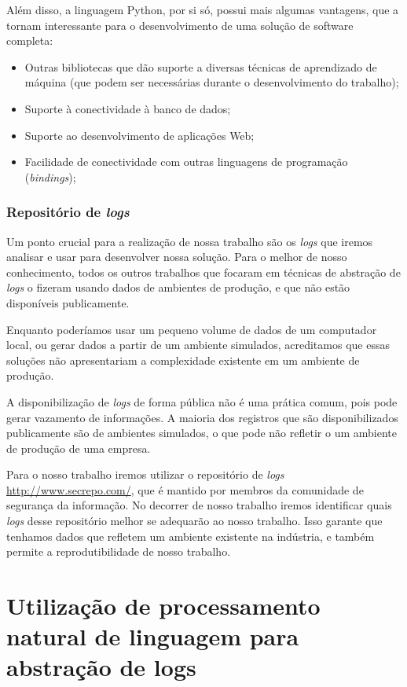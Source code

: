\documentclass[
	12pt,				%
	openright,			%
	twoside,			%
	a4paper,			%
	english,			%
	spanish,			%
	brazil,				%
	]{abntex2}
\begin{document}
Além disso, a linguagem Python, por si só, possui mais algumas vantagens, que a tornam interessante para o desenvolvimento de uma solução de software completa:

\begin{itemize}
	\item Outras bibliotecas que dão suporte a diversas técnicas de aprendizado de máquina (que podem ser necessárias durante o desenvolvimento do trabalho);
	\item Suporte à conectividade à banco de dados;
	\item Suporte ao desenvolvimento de aplicações Web;
	\item Facilidade de conectividade com outras linguagens de programação (\emph{bindings});
\end{itemize}

\subsection{Repositório de \emph{logs}}

Um ponto crucial para a realização de nossa trabalho são os \emph{logs} que iremos analisar e usar para desenvolver nossa solução. Para o melhor de nosso conhecimento, todos os outros trabalhos que focaram em técnicas de abstração de \emph{logs} o fizeram usando dados de ambientes de produção, e que não estão disponíveis publicamente.

Enquanto poderíamos usar um pequeno volume de dados de um computador local, ou gerar dados a partir de um ambiente simulados, acreditamos que essas soluções não apresentariam a complexidade existente em um ambiente de produção.

A disponibilização de \emph{logs} de forma pública não é uma prática comum, pois pode gerar vazamento de informações. A maioria dos registros que são disponibilizados publicamente são de ambientes simulados, o que pode não refletir o um ambiente de produção de uma empresa.

Para o nosso trabalho iremos utilizar o repositório de \emph{logs} \url{http://www.secrepo.com/}, que é mantido por membros da comunidade de segurança da informação. No decorrer de nosso trabalho iremos identificar quais \emph{logs} desse repositório melhor se adequarão ao nosso trabalho. Isso garante que tenhamos dados que refletem um ambiente existente na indústria, e também permite a reprodutibilidade de nosso trabalho.

\chapter{Utilização de processamento natural de linguagem para abstração de logs}\label{chap:proposta}
\end{document}
